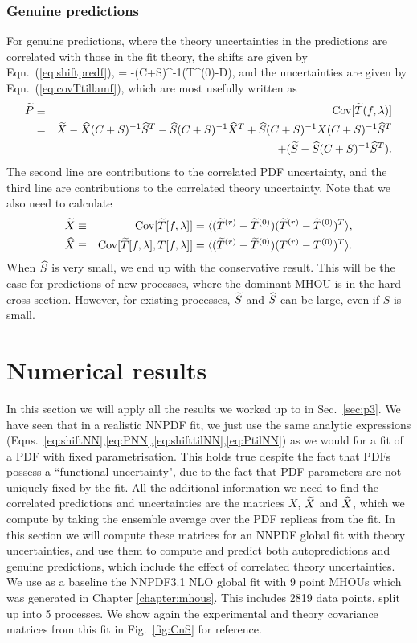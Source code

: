 \subsubsection{Genuine predictions}
For genuine predictions, where the theory uncertainties in the predictions are correlated with those in the fit theory, the shifts are 
given by  Eqn.~(\ref{eq:shiftpredf}), 
\be
\label{eq:shifttilNN}
\delta \Ttil[f]  = -\Shat(C+S)^{-1}(T^{(0)}-D),
\ee
and the uncertainties are given by Eqn.~(\ref{eq:covTtillamf}), which are most usefully written as
\begin{eqnarray}
\widetilde{P}&\equiv&{{\rm Cov}}[\widetilde{T}(f,\lambda)]\nonumber\\
&=&\widetilde{X}  - \widehat{X}(C+S)^{-1}\widehat{S}^T - \widehat{S}(C+S)^{-1}\widehat{X}^T+\widehat{S}(C+S)^{-1}X(C+S)^{-1}\widehat{S}^T
 \nonumber\\ &&\qquad + (\widetilde{S}  - \widehat{S}(C+S)^{-1}\widehat{S}^T) \label{eq:PtilNN}.
\end{eqnarray}
The second line are contributions to the correlated PDF uncertainty, and the third line are contributions to the correlated theory uncertainty. Note that we also need to calculate
\begin{eqnarray} 
\widetilde{X}&\equiv&{\rm Cov}[\widetilde{T}[f,\lambda]] = \langle (\widetilde{T}^{(r)} -\widetilde{T}^{(0)}) (\widetilde{T}^{(r)} - \widetilde{T}^{(0)})^T\rangle\label{eq:XtildefNN},\\
\widehat{X}&\equiv&{\rm Cov}[\widetilde{T}[f,\lambda],T[f,\lambda]] = \langle (\widetilde{T}^{(r)} -\widetilde{T}^{(0)}) (T^{(r)} - T^{(0)})^T\rangle\label{eq:XhatdefNN}.
\end{eqnarray}
When $\widehat{S}$ is very small, we end up with the conservative result. This will be the case for predictions of new processes, where the dominant MHOU is in the hard cross section. However, for existing processes, $\widetilde{S}$ and $\widehat{S}$ can be large, even if $S$ is small.

\section{Numerical results}
In this section we will apply all the results we worked up to in Sec.~\ref{sec:p3}. We have seen that in a realistic NNPDF fit, we just use the same analytic expressions (Eqns.~\ref{eq:shiftNN},\ref{eq:PNN},\ref{eq:shifttilNN},\ref{eq:PtilNN}) as we would for a fit of a PDF with fixed parametrisation. This holds true despite the fact that PDFs possess a ``functional uncertainty", due to the fact that PDF parameters are not uniquely fixed by the fit. All the additional information we need to find the correlated predictions and uncertainties are the matrices $X$, $\widetilde{X}$ and $\widehat{X}$, which we compute by taking the ensemble average over the PDF replicas from the fit. In this section we will compute these matrices for an NNPDF global fit with theory uncertainties, and use them to compute and predict both autopredictions and genuine predictions, which include the effect of correlated theory uncertainties.
We use as a baseline the NNPDF3.1 NLO global fit with 9 point MHOUs which was generated in Chapter \ref{chapter:mhous}. This includes 2819 data points, split up into 5 processes. We show again the experimental and theory covariance matrices from this fit in Fig.~\ref{fig:CnS} for reference.

